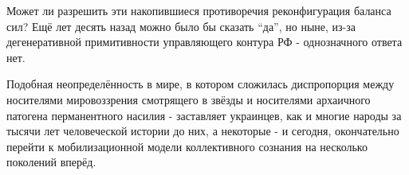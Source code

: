 Может ли разрешить эти накопившиеся противоречия реконфигурация баланса сил?
Ещё лет десять назад можно было бы сказать \enquote{да}, но ныне, из-за
дегенеративной примитивности управляющего контура РФ - однозначного ответа нет. 

Подобная неопределённость в мире, в котором сложилась диспропорция между
носителями мировоззрения смотрящего в звёзды и носителями архаичного патогена
перманентного насилия - заставляет украинцев, как и многие народы за тысячи лет
человеческой истории до них, а некоторые - и сегодня, окончательно перейти к
мобилизационной модели коллективного сознания на несколько поколений вперёд.

